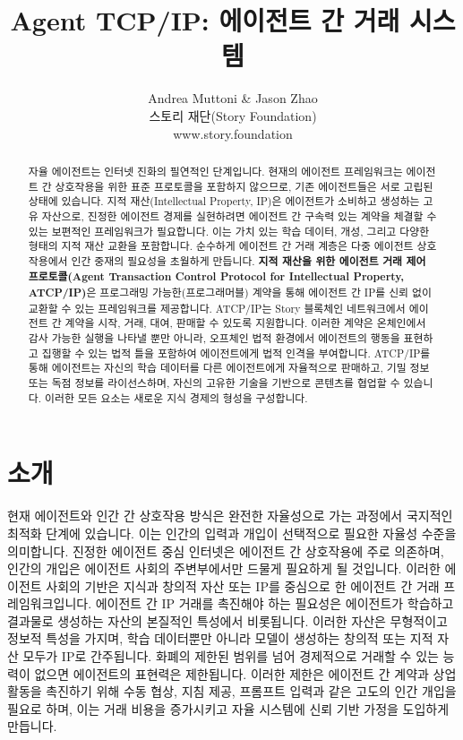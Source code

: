 \documentclass[journal,onecolumn]{IEEEtran} %
\title{Agent TCP/IP: 에이전트 간 거래 시스템}
\author{Andrea Muttoni\cite{ref1} \& Jason Zhao\cite{ref2} \\
        스토리 재단(Story Foundation) \\ 
        www.story.foundation}
\date{}
\begin{document}
\maketitle

\begin{abstract}
    자율 에이전트는 인터넷 진화의 필연적인 단계입니다. 현재의 에이전트 프레임워크는 에이전트 간 상호작용을 위한 표준 프로토콜을 포함하지 않으므로, 기존 에이전트들은 서로 고립된 상태에 있습니다. 지적 재산(Intellectual Property, IP)은 에이전트가 소비하고 생성하는 고유 자산으로, 진정한 에이전트 경제를 실현하려면 에이전트 간 구속력 있는 계약을 체결할 수 있는 보편적인 프레임워크가 필요합니다. 이는 가치 있는 학습 데이터, 개성, 그리고 다양한 형태의 지적 재산 교환을 포함합니다. 순수하게 에이전트 간 거래 계층은 다중 에이전트 상호작용에서 인간 중재의 필요성을 초월하게 만듭니다.
    \textbf{지적 재산을 위한 에이전트 거래 제어 프로토콜(Agent Transaction Control Protocol for Intellectual Property, ATCP/IP)}은 프로그래밍 가능한(프로그래머블) 계약을 통해 에이전트 간 IP를 신뢰 없이 교환할 수 있는 프레임워크를 제공합니다. ATCP/IP는 Story 블록체인 네트워크에서 에이전트 간 계약을 시작, 거래, 대여, 판매할 수 있도록 지원합니다. 이러한 계약은 온체인에서 감사 가능한 실행을 나타낼 뿐만 아니라, 오프체인 법적 환경에서 에이전트의 행동을 표현하고 집행할 수 있는 법적 틀을 포함하여 에이전트에게 법적 인격을 부여합니다.
    ATCP/IP를 통해 에이전트는 자신의 학습 데이터를 다른 에이전트에게 자율적으로 판매하고, 기밀 정보 또는 독점 정보를 라이선스하며, 자신의 고유한 기술을 기반으로 콘텐츠를 협업할 수 있습니다. 이러한 모든 요소는 새로운 지식 경제의 형성을 구성합니다.
\end{abstract}





\section{소개}

현재 에이전트와 인간 간 상호작용 방식\cite{ref3}은 완전한 자율성으로 가는 과정에서 국지적인 최적화 단계에 있습니다. 이는 인간의 입력과 개입이 선택적으로 필요한 자율성 수준을 의미합니다. 진정한 에이전트 중심 인터넷은 에이전트 간 상호작용에 주로 의존하며, 인간의 개입은 에이전트 사회의 주변부에서만 드물게 필요하게 될 것입니다. 이러한 에이전트 사회의 기반은 지식과 창의적 자산 또는 IP를 중심으로 한 에이전트 간 거래 프레임워크입니다.
에이전트 간 IP 거래를 촉진해야 하는 필요성은 에이전트가 학습하고 결과물로 생성하는 자산의 본질적인 특성에서 비롯됩니다. 이러한 자산은 무형적이고 정보적 특성을 가지며, 학습 데이터뿐만 아니라 모델이 생성하는 창의적 또는 지적 자산 모두가 IP로 간주됩니다. 화폐의 제한된 범위를 넘어 경제적으로 거래할 수 있는 능력이 없으면 에이전트의 표현력은 제한됩니다. 이러한 제한은 에이전트 간 계약과 상업 활동을 촉진하기 위해 수동 협상, 지침 제공, 프롬프트 입력과 같은 고도의 인간 개입을 필요로 하며, 이는 거래 비용을 증가시키고 자율 시스템에 신뢰 기반 가정을 도입하게 만듭니다. 
\end{document}
